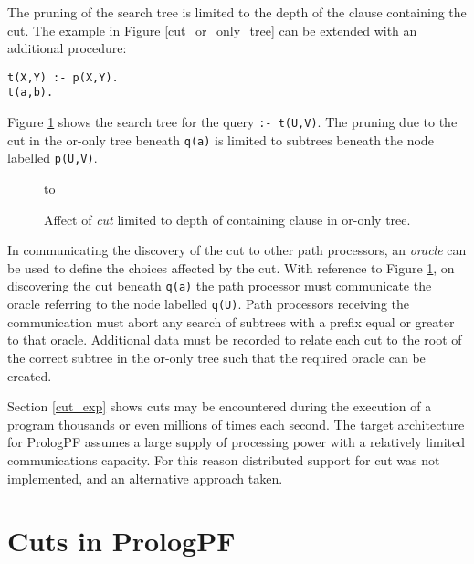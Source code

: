 The pruning of the search tree is limited to the depth of the clause containing the
cut.  The example in Figure \ref{cut_or_only_tree} can be extended with an additional
procedure:
\begin{verbatim}
t(X,Y) :- p(X,Y).
t(a,b).
\end{verbatim}
Figure \ref{cut_or_only_tree2} shows the search tree for the query \texttt{:- t(U,V)}.
The pruning due to the cut in
the or-only tree beneath \texttt{q(a)} is limited to subtrees
beneath the node labelled \texttt{p(U,V)}.

\begin{figure}[htbp]
\vspace{5mm} \hbox to 
\caption{Affect of \textit{cut} limited to depth of containing clause in or-only tree.}
\vspace{5mm}
\label{cut_or_only_tree2}
\end{figure}

In communicating the discovery of the cut to other path processors, an \textit{oracle} can
be used to define the choices affected by the cut.  With reference to 
Figure \ref{cut_or_only_tree2}, on discovering the cut beneath \texttt{q(a)} the path
processor must communicate the oracle referring to the node labelled \texttt{q(U)}. Path
processors receiving the communication must abort any search of subtrees with a prefix
equal or greater to that oracle.  Additional data must be recorded to relate each cut to
the root of the correct subtree in the or-only tree such that the required oracle
can be created.

Section \ref{cut_exp} shows cuts may be encountered during the execution of a program thousands
or even millions of times each second.  The target architecture for PrologPF assumes a large
supply of processing power with a relatively limited communications capacity.  For this 
reason distributed support for cut was not implemented, and an alternative approach taken.

\section{Cuts in PrologPF} %

